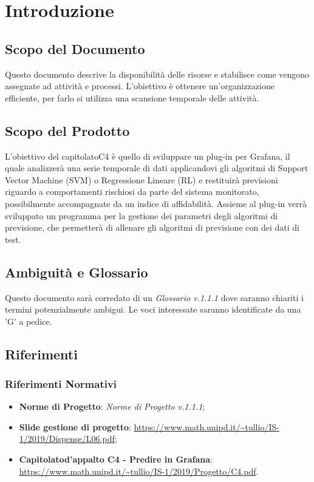 \section{Introduzione}
	\subsection{Scopo del Documento}
		Questo documento descrive la disponibilità delle risorse e stabilisce come vengono assegnate ad attività e processi. L'obiettivo è ottenere un'organizzazione efficiente, per farlo si utilizza una scansione temporale delle attività.
	\subsection{Scopo del Prodotto}
		L'obiettivo del capitolato\glosp C4 è quello di sviluppare un plug-in per Grafana\glo, il quale analizzerà una serie temporale di dati applicandovi gli algoritmi di Support Vector Machine (SVM\glo) o Regressione Lineare (RL\glo) e restituirà previsioni riguardo a comportamenti rischiosi da parte del sistema monitorato, possibilmente accompagnate da un indice di affidabilità. Assieme al plug-in verrà sviluppato un programma per la gestione dei parametri degli algoritmi di previsione, che permetterà di allenare gli algoritmi di previsione con dei dati di test.
	\subsection{Ambiguità e Glossario}
		Questo documento sarà corredato di un \textit{Glossario v.1.1.1} dove saranno chiariti i termini potenzialmente ambigui.
		Le voci interessate saranno identificate da una 'G' a pedice.
	\subsection{Riferimenti}
		\subsubsection{Riferimenti Normativi}
			\begin{itemize}
				\item \textbf{Norme di Progetto}: \textit{Norme di Progetto v.1.1.1};
				\item \textbf{Slide gestione di progetto}: \url{https://www.math.unipd.it/~tullio/IS-1/2019/Dispense/L06.pdf};
				\item \textbf{Capitolato\glosp d'appalto C4 - Predire in Grafana}:  \url{https://www.math.unipd.it/~tullio/IS-1/2019/Progetto/C4.pdf}.
			\end{itemize}
